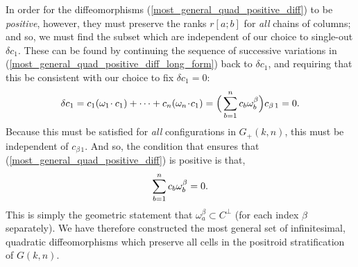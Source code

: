 \documentclass[12pt,hyperref,compress]{JHEP3}
\newcommand{\eq}[1]{\begin{equation}#1\end{equation}}
\begin{document}
{In order for the diffeomorphisms (\ref{most_general_quad_positive_diff}) to be {\it positive}, however, they must preserve the ranks $r[a;b]$ for {\it all} chains of columns; and so, we must find the subset which are independent of our choice to single-out $\delta c_1$. These can be found by continuing the sequence of successive variations in (\ref{most_general_quad_positive_diff_long_form}) back to $\delta c_1$, and requiring that this be consistent with our choice to fix $\delta c_1=0$:
\vspace{-.2cm}\eq{\delta c_1=c_1(\omega_1\!\cdot c_1)+\cdots+c_{n}(\omega_{n}\!\cdot\!c_1)=\Big(\sum_{b=1}^nc_b\omega_b^{\beta}\Big)c_{\beta\,1}=0.\vspace{-.2cm}}
Because this must be satisfied for {\it all} configurations in $G_+(k,n)$, this must be independent of $c_{\beta\,1}$. And so, the condition that ensures that (\ref{most_general_quad_positive_diff}) is positive is that,
\vspace{-.2cm}\eq{\sum_{b=1}^nc_b\omega_b^{\beta}=0.\vspace{-.2cm}\label{constraint_on_variations}}
This is simply the geometric statement that $\omega_a^\beta\!\subset\! C^\perp$ (for each index $\beta$ separately). We have therefore constructed the most general set of infinitesimal, quadratic diffeomorphisms which preserve all cells in the positroid stratification of $G(k,n)$.

}
\end{document}
